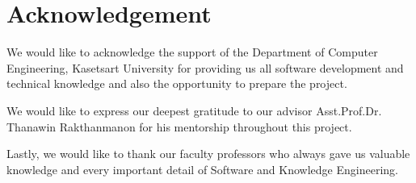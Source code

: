 \chapter*{Acknowledgement}
\label{chap:acknowledgement}

We would like to acknowledge the support of the Department of Computer Engineering, Kasetsart University for providing us all software development and technical knowledge and also the opportunity to prepare the project.

\vspace{1em}

We would like to express our deepest gratitude to our advisor Asst.Prof.Dr. Thanawin Rakthanmanon for his mentorship throughout this project.

\vspace{1em}

Lastly, we would like to thank our faculty professors who always gave us valuable knowledge and every important detail of Software and Knowledge Engineering.

\vspace{2em}

\vspace{.2in}
\begin{flushright}
     \\
     \\
\end{flushright}